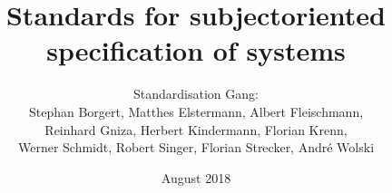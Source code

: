 \documentclass[a4paper,12pt]{book}
\begin{document}
	
	\author{Standardisation Gang: \\ Stephan Borgert, Matthes Elstermann, Albert Fleischmann, \\ Reinhard Gniza, Herbert Kindermann, Florian Krenn,\\ Werner Schmidt, Robert Singer, Florian Strecker, André Wolski}
	\title{Standards for subjectoriented specification of systems}
	\date{August 2018}
	
	\frontmatter
	\maketitle
	\tableofcontents
	
	\mainmatter
	
	
	
	
	
	
\end{document}
